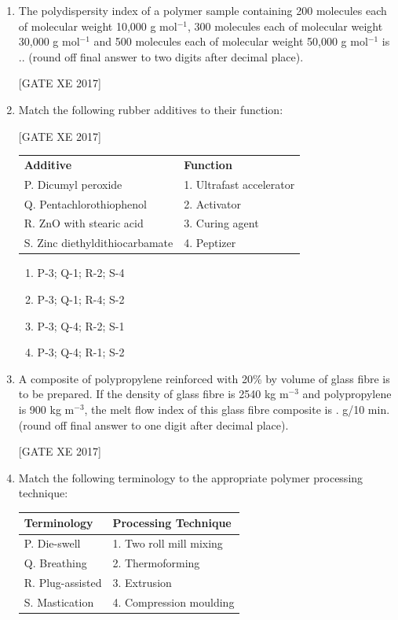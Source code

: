 \documentclass[journal,12pt,onecolumn]{IEEEtran}
\theoremstyle{remark}
\begin{document}
\begin{enumerate}
\hfill [GATE XE 2017]  

\item The polydispersity index of a polymer sample containing 200 molecules each of molecular weight 10,000 g mol$^{-1}$, 300 molecules each of molecular weight 30,000 g mol$^{-1}$ and 500 molecules each of molecular weight 50,000 g mol$^{-1}$ is \underline{\hspace{2cm}}.. (round off final answer to two digits after decimal place).  

\hfill [GATE XE 2017]  

\item Match the following rubber additives to their function:  

\hfill [GATE XE 2017]  

\begin{tabular}{ll}
\textbf{Additive} & \textbf{Function} \\
P. Dicumyl peroxide & 1. Ultrafast accelerator \\
Q. Pentachlorothiophenol & 2. Activator \\
R. ZnO with stearic acid & 3. Curing agent \\
S. Zinc diethyldithiocarbamate & 4. Peptizer
\end{tabular}

\begin{multicols}{2}  
\begin{enumerate}  
\item P-3; Q-1; R-2; S-4  
\item P-3; Q-1; R-4; S-2  
\item P-3; Q-4; R-2; S-1  
\item P-3; Q-4; R-1; S-2  
\end{enumerate}  
\end{multicols}  

\item A composite of polypropylene reinforced with 20\% by volume of glass fibre is to be prepared. If the density of glass fibre is 2540 kg m$^{-3}$ and polypropylene is 900 kg m$^{-3}$, the melt flow index of this glass fibre composite is \underline{\hspace{2cm}}. g/10 min. (round off final answer to one digit after decimal place).  

\hfill [GATE XE 2017]  

\item Match the following terminology to the appropriate polymer processing technique:

\begin{tabular}{|l|l|}
\hline
\textbf{Terminology} & \textbf{Processing Technique} \\
\hline
P. Die-swell & 1. Two roll mill mixing \\
Q. Breathing & 2. Thermoforming \\
R. Plug-assisted & 3. Extrusion \\
S. Mastication & 4. Compression moulding \\
\hline
\end{tabular}


\end{enumerate}
\end{document}
